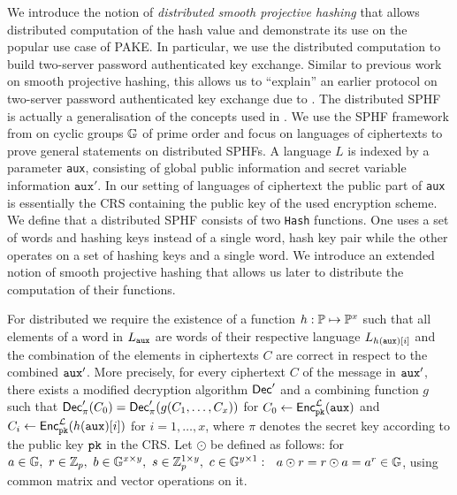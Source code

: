 We introduce the notion of \emph{distributed smooth projective hashing} that allows distributed computation of the hash value and demonstrate its use on the popular use case of \acl{PAKE}.
In particular, we use the distributed computation to build two-server password authenticated key exchange.
Similar to previous work on smooth projective hashing, this allows us to ``explain'' an earlier protocol on two-server password authenticated key exchange due to \citeauthor{Katz2012a} \cite{Katz2012a}.
The distributed \ac{SPHF} is actually a generalisation of the concepts used in \cite{Katz2012a}.
We use the \ac{SPHF} framework from \cite{Benhamouda2013} on cyclic groups $\mathbb{G}$ of prime order and focus on languages of ciphertexts to prove general statements on distributed \acp{SPHF}.
A language $L$ is indexed by a parameter \texttt{aux}, consisting of global public information and secret variable information $\mathtt{aux}'$.
In our setting of languages of ciphertext the public part of \texttt{aux} is essentially the \ac{CRS} containing the public key of the used encryption scheme.
We define that a distributed \ac{SPHF} consists of two \texttt{Hash} functions.
One uses a set of words and hashing keys instead of a single word, hash key pair while the other operates on a set of hashing keys and a single word.
We introduce an extended notion of smooth projective hashing that allows us later to distribute the computation of their functions.

For distributed \SPHFF we require the existence of a function $h:\mathbb{P}\mapsto\mathbb{P}^x$ such that all elements of a word in $L_\mathtt{aux}$ are words of their respective language $L_{h(\mathtt{aux})[i]}$ and the combination of the elements in ciphertexts $C$ are correct in respect to the combined $\mathtt{aux}'$.
More precisely, for every ciphertext $C$ of the message in $\mathtt{aux}'$, there exists a modified decryption algorithm $\mathsf{Dec}'$ and a combining function $g$ such that $\mathsf{Dec}'_{\pi}(C_0)=\mathsf{Dec}'_{\pi}(g(C_1,\dots,C_x))$ for $C_0\gets\mathsf{Enc}_{\mathtt{pk}}^\mathcal{L}(\mathtt{aux})$ and $C_i\gets\mathsf{Enc}_{\mathtt{pk}}^\mathcal{L}(h(\mathtt{aux})[i])$ for $i=1,\dots,x$, where $\pi$ denotes the secret key according to the public key $\mathtt{pk}$ in the \ac{CRS}.
Let $\odot$ be defined as follows: for $a\in \mathbb{G},~ r\in\mathbb{Z}_p,~ b\in \mathbb{G}^{x\times y},~ s\in\mathbb{Z}_p^{1\times y},~ c\in \mathbb{G}^{y\times 1}:$~ $a\odot r = r\odot a = a^r\in \mathbb{G}$, using common matrix and vector operations on it. 

